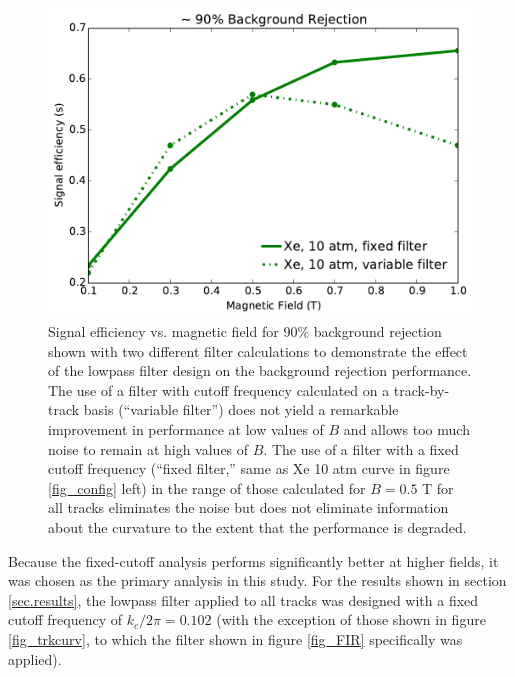 \documentclass{JINST}
\begin{document}
\begin{figure}[!htb]
	\centering
	\includegraphics[scale=0.6]{fig/eff_vs_b_cf_filter_90.pdf}
	\caption{\label{fig_FIRdependence}Signal efficiency vs. magnetic field for 90\% background rejection shown with two different filter calculations to demonstrate the effect of the lowpass filter design on the background rejection performance.  The use of a filter with cutoff frequency calculated on a track-by-track basis (``variable filter'') does not yield a remarkable improvement in performance at low values of $B$ and allows too much noise to remain at high values of $B$.  The use of a filter with a fixed cutoff frequency (``fixed filter,'' same as Xe 10 atm curve in figure \protect\ref{fig_config} left) in the range of those calculated for $B = 0.5$ T for all tracks eliminates the noise but does not eliminate information about the curvature to the extent that the performance is degraded.}
\end{figure}

Because the fixed-cutoff analysis performs significantly better at higher fields, it was chosen as the primary 
analysis in this study.  For the results shown in section \ref{sec.results}, the lowpass filter applied to all tracks 
was designed with a fixed cutoff frequency of $k_{c}/2\pi = 0.102$ (with the exception of those shown in figure \ref{fig_trkcurv}, to which the filter shown in figure \ref{fig_FIR} specifically was applied).

\end{document}
